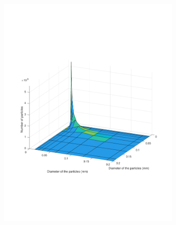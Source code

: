 \documentclass[preprint,11pt,authoryear]{elsarticle}
\begin{document}
\begin{figure}
\begin{subfigure}{.5\textwidth}
\includegraphics[scale=0.45]{rslts-PBM_30s_psd.pdf}
\caption{}	
\label{fig:30s}
\end{subfigure}\hfill
\begin{subfigure}{.5\textwidth}


\end{subfigure}
\end{figure}
\end{document}

